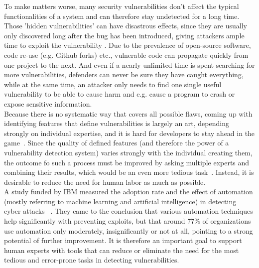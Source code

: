 \documentclass[
a4paper,
pagesize,
pdftex,
12pt,
twoside, %
BCOR=5mm, %
ngerman,
fleqn,
final,
]{scrartcl}
\begin{document}
	To make matters worse, many security vulnerabilities don't affect the typical functionalities of a system and can therefore stay undetected for a long time. Those 'hidden vulnerabilities' can have disastrous effects, since they are usually only discovered long after the bug has been introduced, giving attackers ample time to exploit the vulnerability \cite{Wijayasekara.2012,Ma.2017,Russell.2018}. Due to the prevalence of open-source software, code re-use (e.g. Github forks) etc., vulnerable code can propagate quickly from one project to the next. And even if a nearly unlimited time is spent searching for more vulnerabilities, defenders can never be sure they have caught everything, while at the same time, an attacker only needs to find one single useful vulnerability to be able to cause harm and e.g. cause a program to crash or expose sensitive information.\\
	Because there is no systematic way that covers all possible flaws, coming up with identifying features that define vulnerabilities is largely an art, depending strongly on individual expertise, and it is hard for developers to stay ahead in the game~\cite{Rolim.2018,Li.2018}. Since the quality of defined features (and therefore the power of a vulnerability detection system) varies strongly with the individual creating them, the outcome fo such a process must be improved by asking multiple experts and combining their results, which would be an even more tedious task~\cite{Li.2018}. Instead, it is desirable to reduce the need for human labor as much as possible.\\
	A study funded by IBM measured the adoption rate and the effect of automation (mostly referring to machine learning and artificial intelligence) in detecting cyber attacks ~\cite{IBMNewsRoom.}. They came to the conclusion that various automation techniques help significantly with preventing exploits, but that around 77\% of organizations use automation only moderately, insignificantly or not at all, pointing to a strong potential of further improvement. It is therefore an important goal to support human experts with tools that can reduce or eliminate the need for the most tedious and error-prone tasks in detecting vulnerabilities.\\
\end{document}
